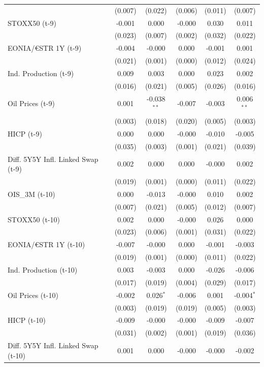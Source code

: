 \begin{longtable}[t]{lccccc}
 & (0.007) & (0.022) & (0.006) & (0.011) & (0.007)\\
STOXX50 (t-9) & -0.001 & 0.000 & -0.000 & 0.030 & 0.011\\
 & (0.023) & (0.007) & (0.002) & (0.032) & (0.022)\\
EONIA/€STR 1Y (t-9) & -0.004 & -0.000 & 0.000 & -0.001 & 0.001\\
 & (0.021) & (0.001) & (0.000) & (0.012) & (0.024)\\
Ind. Production (t-9) & 0.009 & 0.003 & 0.000 & 0.023 & 0.002\\
 & (0.016) & (0.021) & (0.005) & (0.026) & (0.016)\\
Oil Prices (t-9) & 0.001 & -0.038$^{**}$ & -0.007 & -0.003 & 0.006$^{**}$\\
 & (0.003) & (0.018) & (0.020) & (0.005) & (0.003)\\
HICP (t-9) & 0.000 & 0.000 & -0.000 & -0.010 & -0.005\\
 & (0.035) & (0.003) & (0.001) & (0.021) & (0.039)\\
Diff. 5Y5Y Infl. Linked Swap (t-9) & 0.002 & 0.000 & 0.000 & -0.000 & 0.002\\
 & (0.019) & (0.001) & (0.000) & (0.011) & \vphantom{1} (0.022)\\
OIS\_3M (t-10) & 0.000 & -0.013 & -0.000 & 0.010 & 0.002\\
 & (0.007) & (0.021) & (0.005) & (0.012) & (0.007)\\
STOXX50 (t-10) & 0.002 & 0.000 & -0.000 & 0.026 & 0.000\\
 & (0.023) & (0.006) & (0.001) & (0.031) & (0.022)\\
EONIA/€STR 1Y (t-10) & -0.007 & -0.000 & 0.000 & -0.001 & -0.003\\
 & (0.019) & (0.001) & (0.000) & (0.011) & (0.022)\\
Ind. Production (t-10) & 0.003 & -0.003 & 0.000 & -0.026 & -0.006\\
 & (0.017) & (0.019) & (0.004) & (0.029) & (0.017)\\
Oil Prices (t-10) & -0.002 & 0.026$^{*}$ & -0.006 & 0.001 & -0.004$^{*}$\\
 & (0.003) & (0.019) & (0.019) & (0.005) & (0.003)\\
HICP (t-10) & -0.009 & -0.000 & -0.000 & -0.009 & -0.007\\
 & (0.031) & (0.002) & (0.001) & (0.019) & (0.036)\\
Diff. 5Y5Y Infl. Linked Swap (t-10) & 0.001 & 0.000 & -0.000 & -0.000 & -0.002\\

\end{longtable}
